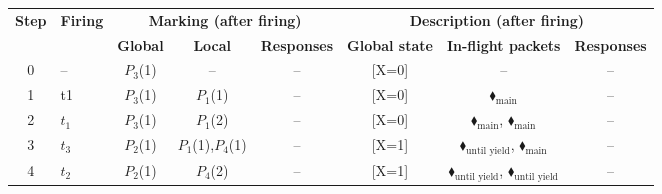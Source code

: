 \begin{table}[H]
	\centering
	\label{tab:reach-seq}
	\begin{tabular}{c l c c c c c c}
		\toprule
		\textbf{Step} 
		& \textbf{Firing} 
		& \multicolumn{3}{c}{\textbf{Marking (after firing)}} 
		& \multicolumn{3}{c}{\textbf{Description (after firing)}} \\
		\cmidrule(lr){3-5} \cmidrule(lr){6-8}
		& 
		& \textbf{Global} 
		& \textbf{Local} 
		& \textbf{Responses} 
		& \textbf{Global state} 
		& \textbf{In-flight packets} 
		& \textbf{Responses} \\
		\midrule
		0 & --                                  
		& {\color{blue}$P_3$(1)}                  
		& --                                    
		& --                                    
		& {\color{blue}[X=0]}                   
		& --                          
		& --                                    \\
		1 & t1 
		& {\color{blue}$P_3$(1)}                  
		& $P_1$(1)                                
		& --                                    
		& {\color{blue}[X=0]}                   
		& {\color{ForestGreen}$\blacklozenge_\text{main}$} 
		& --                                    \\
		2 & $t_1$ 
		& {\color{blue}$P_3$(1)}                  
		& $P_1$(2)                                
		& --                                    
		& {\color{blue}[X=0]}                   
		& {\color{ForestGreen}$\blacklozenge_\text{main}$}, {\color{ForestGreen}$\blacklozenge_\text{main}$}  
		& --                                    \\
		3 & $t_3$                                  
		& {\color{blue}$P_2$(1)}                  
		& $P_1$(1),$P_4$(1)                          
		& --                                   
		&                                    {\color{blue}[X=1]}    
		&                                    {\color{black}$\blacklozenge_\text{until yield}$}, {\color{ForestGreen}$\blacklozenge_\text{main}$}   
		& --                                    \\
		4 & $t_2$                                  
		& {\color{blue}$P_2$(1)}                  
		& $P_4$(2)                                
		& --                                    
		&                                    {\color{blue}[X=1]}    
		&                                    {\color{black}$\blacklozenge_\text{until yield}$}, {\color{black}$\blacklozenge_\text{until yield}$}   
		& --                                    \\

\end{tabular}
\end{table}
